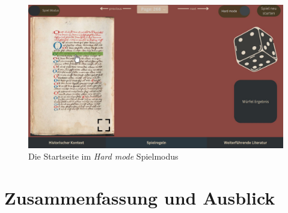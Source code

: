 \documentclass[12pt,a4paper]{article}
\begin{document}
			\begin{figure}[htbp]
				\centering
				\includegraphics[scale=0.3]{ansicht-gamemodus-hard.JPG}
				\caption{Die Startseite im \textit{Hard mode} Spielmodus}
				\label{Abbildung 5}
			\end{figure}

\section{Zusammenfassung und Ausblick}


\printbibliography
\end{document}
